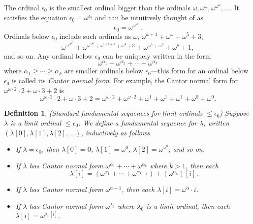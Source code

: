 \documentclass{article}
\newtheorem{definition}[theorem]{Definition}
\begin{document}
The ordinal $\epsilon_0$ is the smallest ordinal bigger than the ordinals
$\omega,\omega^\omega,\omega^{\omega^\omega},\ldots$. It satisfies the equation
$\epsilon_0=\omega^{\epsilon_0}$ and can be intuitively thought of as
\[
    \epsilon_0 = \omega^{\omega^{\omega^{\iddots}}}.
\]
Ordinals below $\epsilon_0$ include such ordinals as $\omega$,
$\omega^{\omega+1}+\omega^{\omega}+\omega^5+3$,
\[
\omega^{\omega^{\omega^{\omega^\omega}}}+
\omega^{\omega^{\omega^\omega}+\omega^{\omega\cdot 2+1}+\omega^4 + 3}
+ \omega^{\omega^5+\omega^3}+\omega^8+1,
\]
and so on.
Any ordinal below $\epsilon_0$ can be uniquely written in the form
\[
    \omega^{\alpha_1}+\omega^{\alpha_2}+\cdots + \omega^{\alpha_k}
\]
where $\alpha_1\geq\cdots\geq\alpha_k$ are smaller ordinals below $\epsilon_0$---this form
for an ordinal below $\epsilon_0$ is called its \emph{Cantor normal form}.
For example, the Cantor normal form for $\omega^{\omega\cdot 2}\cdot 2+\omega\cdot 3+2$
is
\[
\omega^{\omega\cdot 2}\cdot 2+\omega\cdot 3+2
=
\omega^{\omega\cdot 2} + \omega^{\omega\cdot 2} + \omega^1 + \omega^1 + \omega^1
+\omega^0 + \omega^0.
\]

\begin{definition}
    (Standard fundamental sequences for limit ordinals $\leq\epsilon_0$)
    Suppose $\lambda$ is a limit ordinal $\leq\epsilon_0$. We define a
    \emph{fundamental sequence for $\lambda$},
    written $(\lambda[0],\lambda[1],\lambda[2],\ldots)$, inductively as follows.
    \begin{itemize}
        \item
        If $\lambda=\epsilon_0$, then $\lambda[0]=0$,
        $\lambda[1]=\omega^0$, $\lambda[2]=\omega^{\omega^0}$, and so on.
        \item
        If $\lambda$ has Cantor normal form
        $\omega^{\alpha_1}+\cdots+\omega^{\alpha_k}$ where $k>1$,
        then
        each
        \[
            \lambda[i] = (\omega^{\alpha_1}+\cdots+\omega^{\alpha_{k-1}})
            + (\omega^{\alpha_k})[i].
        \]
        \item
        If $\lambda$ has Cantor normal form $\omega^{\alpha+1}$,
        then each $\lambda[i]=\omega^{\alpha}\cdot i$.
        \item
        If $\lambda$ has Cantor normal form $\omega^{\lambda_0}$ where $\lambda_0$
        is a limit ordinal, then each $\lambda[i]=\omega^{\lambda_0[i]}$.
    \end{itemize}
\end{definition}
\end{document}
